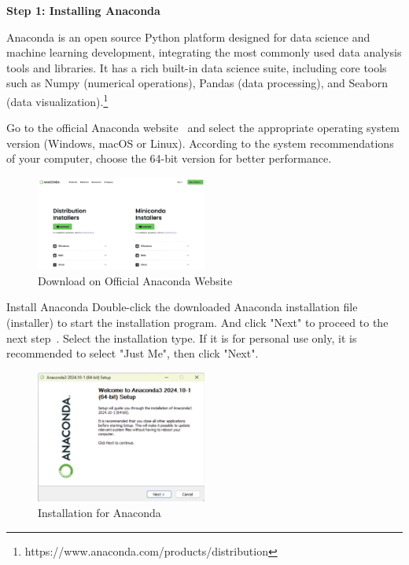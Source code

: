 \begin{ZhChapter}
    \textbf{Step 1: Installing Anaconda} 

    Anaconda is an open source Python platform designed for data science and machine learning development, integrating the most commonly used data analysis tools and libraries. It has a rich built-in data science suite, including core tools such as Numpy (numerical operations), Pandas (data processing), and Seaborn (data visualization).\footnote{https://www.anaconda.com/products/distribution}

    Go to the official Anaconda website~\label{fig: DownloadAnaconda} and select the appropriate operating system version (Windows, macOS or Linux).
    According to the system recommendations of your computer, choose the 64-bit version for better performance.
\begin{figure}[htbp]
    \centering
    \includegraphics[width = 0.5\textwidth]{image/DownloadAnaconda.jpg}
    \caption{Download on Official Anaconda Website}
    \label{fig: DownloadAnaconda}
\end{figure}

    Install Anaconda
    Double-click the downloaded Anaconda installation file (installer) to start the installation program. And click "Next" to proceed to the next step~\label{fig: InstallAnaconda}.
    Select the installation type. If it is for personal use only, it is recommended to select "Just Me", then click "Next".
\begin{figure}[htbp]
    \centering
    \includegraphics[width = 0.5\textwidth]{image/InstallAnaconda.jpg}
    \caption{Installation for Anaconda}
    \label{fig: InstallAnaconda}
\end{figure}


\end{ZhChapter}
